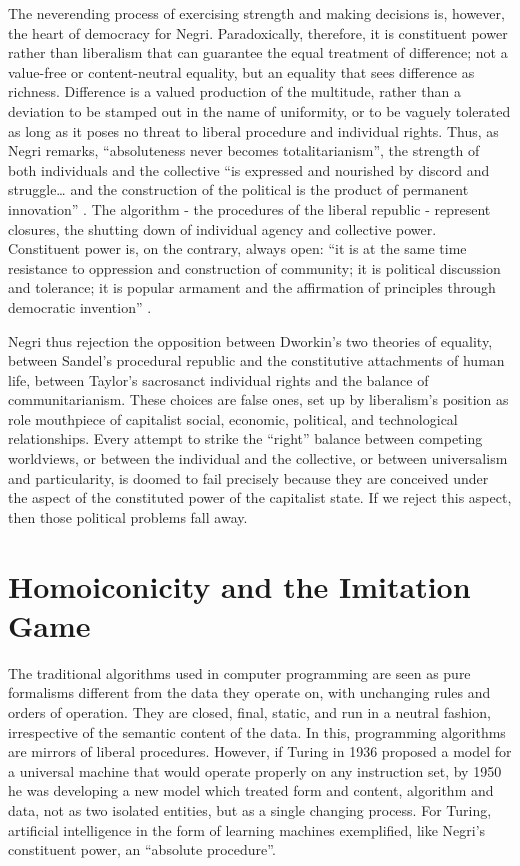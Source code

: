 \documentclass[12pt,oneside]{memoir}
\begin{document}
The neverending process of exercising strength and making decisions is, however, the heart of democracy for Negri. Paradoxically, therefore, it is constituent power rather than liberalism that can guarantee the equal treatment of difference; not a value-free or content-neutral equality, but an equality that sees difference as richness. Difference is a valued production of the multitude, rather than a deviation to be stamped out in the name of uniformity, or to be vaguely tolerated as long as it poses no threat to liberal procedure and individual rights. Thus, as Negri remarks, ``absoluteness never becomes totalitarianism'', the strength of both individuals and the collective ``is expressed and nourished by discord and struggle{\ldots} and the construction of the political is the product of permanent innovation'' \citep[29]{Negri1999}. The algorithm - the procedures of the liberal republic - represent closures, the shutting down of individual agency and collective power. Constituent power is, on the contrary, always open: ``it is at the same time resistance to oppression and construction of community; it is political discussion and tolerance; it is popular armament and the affirmation of principles through democratic invention'' \cite[29]{Negri1999}.
	
Negri thus rejection the opposition between Dworkin's two theories of equality, between Sandel's procedural republic and the constitutive attachments of human life, between Taylor's sacrosanct individual rights and the balance of communitarianism. These choices are false ones, set up by liberalism's position as role mouthpiece of capitalist social, economic, political, and technological relationships. Every attempt to strike the ``right'' balance between competing worldviews, or between the individual and the collective, or between universalism and particularity, is doomed to fail precisely because they are conceived under the aspect of the constituted power of the capitalist state. If we reject this aspect, then those political problems fall away.


\section*{Homoiconicity and the Imitation Game}

The traditional algorithms used in computer programming are seen as pure formalisms different from the data they operate on, with unchanging rules and orders of operation. They are closed, final, static, and run in a neutral fashion, irrespective of the semantic content of the data. In this, programming algorithms are mirrors of liberal procedures. However, if Turing in 1936 proposed a model for a universal machine that would operate properly on any instruction set, by 1950 he was developing a new model which treated form and content, algorithm and data, not as two isolated entities, but as a single changing process. For Turing, artificial intelligence in the form of learning machines exemplified, like Negri's constituent power, an ``absolute procedure''.
	
\end{document}
